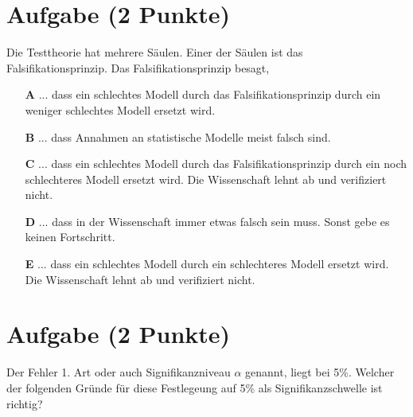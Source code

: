 \documentclass[a4paper, 9pt]{scrartcl}\usepackage[]{graphicx}\usepackage[]{xcolor}
\begin{document}
\section{Aufgabe \hfill (2 Punkte)}



Die Testtheorie hat mehrere Säulen. Einer der Säulen ist das Falsifikationsprinzip. Das Falsifikationsprinzip besagt,



\begin{enumerate}
\item [\textbf{A} \msquare] ... dass ein schlechtes Modell durch das Falsifikationsprinzip durch ein weniger schlechtes Modell ersetzt wird.
\item [\textbf{B} \msquare] ... dass Annahmen an statistische Modelle meist falsch sind.
\item [\textbf{C} \msquare] ... dass ein schlechtes Modell durch das Falsifikationsprinzip durch ein noch schlechteres Modell ersetzt wird. Die Wissenschaft lehnt ab und verifiziert nicht.
\item [\textbf{D} \msquare] ... dass in der Wissenschaft immer etwas falsch sein muss. Sonst gebe es keinen Fortschritt.
\item [\textbf{E} \msquare] ... dass ein schlechtes Modell durch ein schlechteres Modell ersetzt wird. Die Wissenschaft lehnt ab und verifiziert nicht.
\end{enumerate}

\section{Aufgabe \hfill (2 Punkte)}



Der Fehler 1. Art oder auch Signifikanzniveau $\alpha$ genannt, liegt bei
5\%. Welcher der folgenden Gründe für diese Festlegeung auf 5\% als Signifikanzschwelle ist richtig?
\end{document}
